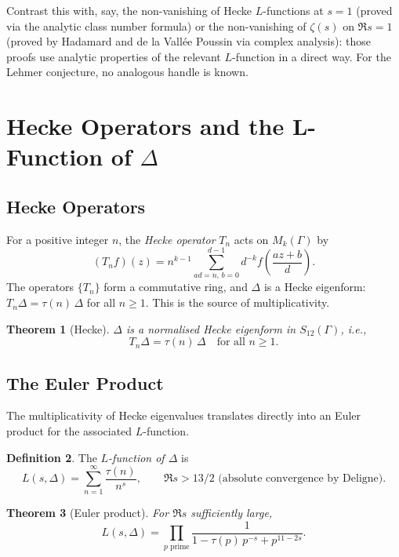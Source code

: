 \documentclass[12pt,a4paper]{amsart}
\newtheorem{theorem}{Theorem}[section]
\theoremstyle{definition}
\newtheorem{definition}[theorem]{Definition}
\begin{document}
Contrast this with, say, the non-vanishing of Hecke $L$-functions at $s=1$ (proved
via the analytic class number formula) or the non-vanishing of $\zeta(s)$ on
$\Re s = 1$ (proved by Hadamard and de la Vall\'ee Poussin via complex analysis):
those proofs use analytic properties of the relevant $L$-function in a direct way.
For the Lehmer conjecture, no analogous handle is known.

\section{Hecke Operators and the L-Function of $\Delta$}
\label{sec:hecke}

\subsection{Hecke Operators}

For a positive integer $n$, the \emph{Hecke operator} $T_n$ acts on
$M_k(\Gamma)$ by
\[
  (T_n f)(z) = n^{k-1} \sum_{ad=n,\, b=0}^{d-1}
  d^{-k} f\!\left(\frac{az+b}{d}\right).
\]
The operators $\{T_n\}$ form a commutative ring, and $\Delta$ is a Hecke eigenform:
$T_n \Delta = \tau(n)\, \Delta$ for all $n \geq 1$. This is the source of
multiplicativity.

\begin{theorem}[Hecke]\label{thm:hecke-eigenform}
  $\Delta$ is a normalised Hecke eigenform in $S_{12}(\Gamma)$, i.e.,
  \[
    T_n \Delta = \tau(n)\, \Delta \quad \text{for all } n \geq 1.
  \]
\end{theorem}

\subsection{The Euler Product}

The multiplicativity of Hecke eigenvalues translates directly into an Euler product
for the associated $L$-function.

\begin{definition}
  The \emph{$L$-function of $\Delta$} is
  \[
    L(s, \Delta) = \sum_{n=1}^{\infty} \frac{\tau(n)}{n^s},
    \qquad \Re s > 13/2 \text{ (absolute convergence by Deligne).}
  \]
\end{definition}

\begin{theorem}[Euler product]\label{thm:euler-product}
  For $\Re s$ sufficiently large,
  \begin{equation}\label{eq:euler-product}
    L(s, \Delta)
    = \prod_{p \text{ prime}}
      \frac{1}{1 - \tau(p)\,p^{-s} + p^{11-2s}}.
  \end{equation}
\end{theorem}
\end{document}
